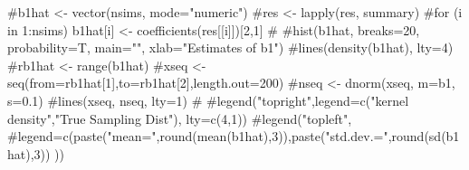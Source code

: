 \begin{Schunk}
\begin{Sinput}
 #b1hat <- vector(nsims, mode="numeric")
 #res <- lapply(res, summary)
 #for (i in 1:nsims){ b1hat[i] <- coefficients(res[[i]])[2,1]}
 #
 #hist(b1hat, breaks=20, probability=T, main="", xlab="Estimates of b1")
 #lines(density(b1hat), lty=4)
 #rb1hat <- range(b1hat)
 #xseq <- seq(from=rb1hat[1],to=rb1hat[2],length.out=200)
 #nseq <- dnorm(xseq, m=b1, s=0.1)
 #lines(xseq, nseq, lty=1)
 #
 #legend("topright",legend=c("kernel density","True Sampling Dist"), lty=c(4,1))
 #legend("topleft", #legend=c(paste("mean=",round(mean(b1hat),3)),paste("std.dev.=",round(sd(b1hat),3)) ))
\end{Sinput}
\end{Schunk}
